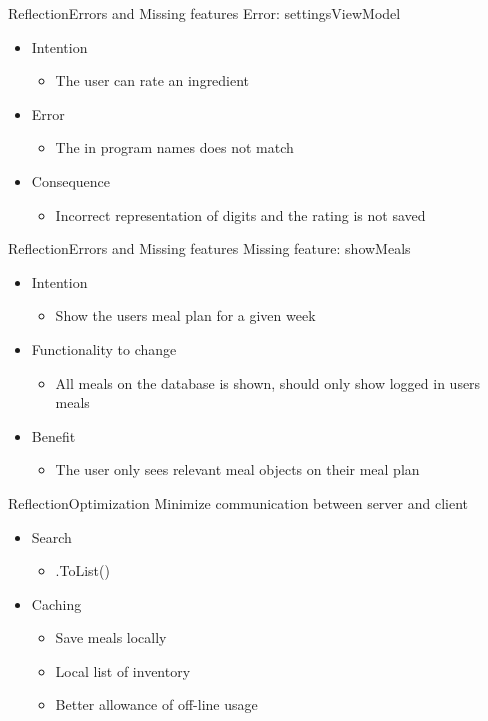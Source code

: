 \begin{frame}{Reflection}{Errors and Missing features}%
	Error: settingsViewModel
	\begin{itemize}
		\item Intention
			\begin{itemize}
			\item The user can rate an ingredient
			\end{itemize}
		\item Error
			\begin{itemize}
			\item The in program names does not match
			\end{itemize}
		\item Consequence
			\begin{itemize}
			\item Incorrect representation of digits and the rating is not saved
			\end{itemize}
	\end{itemize}
\end{frame}
\begin{frame}{Reflection}{Errors and Missing features}	
		Missing feature: showMeals
		\begin{itemize}
			\item Intention
				\begin{itemize}
				\item Show the users meal plan for a given week
				\end{itemize}
			\item Functionality to change
				\begin{itemize}
				\item All meals on the database is shown, should only show logged in users meals
				\end{itemize}
			\item Benefit
				\begin{itemize}
				\item The user only sees relevant meal objects on their meal plan
				\end{itemize}
		\end{itemize}
\end{frame} %


\begin{frame}{Reflection}{Optimization}
	Minimize communication between server and client
	\begin{itemize}
		\item Search
		\begin{itemize}
			\item .ToList()
		\end{itemize}
		\item Caching
		\begin{itemize}
			\item Save meals locally
			\item Local list of inventory
			\item Better allowance of off-line usage
		\end{itemize}
	\end{itemize}
\end{frame}

